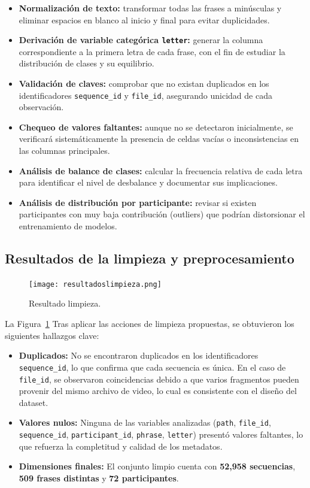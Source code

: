 \documentclass[12pt]{article}
\begin{document}
\begin{itemize}
    \item \textbf{Normalización de texto:} transformar todas las frases a minúsculas y eliminar espacios en blanco al inicio y final para evitar duplicidades.
    \item \textbf{Derivación de variable categórica \texttt{letter}:} generar la columna correspondiente a la primera letra de cada frase, con el fin de estudiar la distribución de clases y su equilibrio.
    \item \textbf{Validación de claves:} comprobar que no existan duplicados en los identificadores \texttt{sequence\_id} y \texttt{file\_id}, asegurando unicidad de cada observación.
    \item \textbf{Chequeo de valores faltantes:} aunque no se detectaron inicialmente, se verificará sistemáticamente la presencia de celdas vacías o inconsistencias en las columnas principales.
    \item \textbf{Análisis de balance de clases:} calcular la frecuencia relativa de cada letra para identificar el nivel de desbalance y documentar sus implicaciones.
    \item \textbf{Análisis de distribución por participante:} revisar si existen participantes con muy baja contribución (outliers) que podrían distorsionar el entrenamiento de modelos.
\end{itemize}



\subsection{Resultados de la limpieza y preprocesamiento}



\begin{figure}[h]
    \centering
    \texttt{[image: resultadoslimpieza.png]}
    \caption{Resultado limpieza.}
    \label{fig:limpieza}
\end{figure}


La Figura~\ref{fig:limpieza} Tras aplicar las acciones de limpieza propuestas, se obtuvieron los siguientes hallazgos clave: 



\begin{itemize}
    \item \textbf{Duplicados:} No se encontraron duplicados en los identificadores \texttt{sequence\_id}, lo que confirma que cada secuencia es única. En el caso de \texttt{file\_id}, se observaron coincidencias debido a que varios fragmentos pueden provenir del mismo archivo de video, lo cual es consistente con el diseño del dataset.
    \item \textbf{Valores nulos:} Ninguna de las variables analizadas (\texttt{path}, \texttt{file\_id}, \texttt{sequence\_id}, \texttt{participant\_id}, \texttt{phrase}, \texttt{letter}) presentó valores faltantes, lo que refuerza la completitud y calidad de los metadatos.
    \item \textbf{Dimensiones finales:} El conjunto limpio cuenta con \textbf{52,958 secuencias}, \textbf{509 frases distintas} y \textbf{72 participantes}.
\end{itemize}
\end{document}

